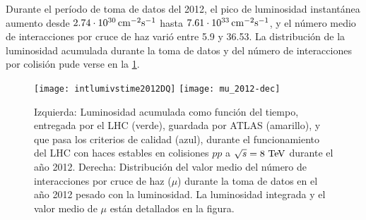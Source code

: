 Durante el período de toma de datos del 2012, el pico de luminosidad instantánea
aumento desde $\unit[2.74 \cdot 10^{30}]{cm^{-2} s^{-1}}$ hasta
$\unit[7.61 \cdot 10^{33}]{cm^{-2} s^{-1}}$, y el número medio de interacciones por cruce
de haz varió entre 5.9 y 36.53. La distribución de la luminosidad acumulada
durante la toma de datos y del número de interacciones por colisión pude verse en
la \cref{fig:lumi}.

\begin{figure}[!p]
  \centering

  \texttt{[image: intlumivstime2012DQ]}
  \texttt{[image: mu\_2012-dec]}

  \caption{Izquierda: Luminosidad acumulada como función del tiempo, entregada por el LHC (verde),
    guardada por ATLAS (amarillo), y que pasa los criterios de calidad (azul),
    durante el funcionamiento del LHC con haces estables en colisiones $pp$ a $\sqrt{s}=8\tev$ durante el a\~no 2012\cite{lumiplots}.
    Derecha: Distribución del valor medio del número de interacciones por cruce
    de haz ($\mu$) durante la toma de datos en el a\~no 2012 pesado con la luminosidad.
    La luminosidad integrada y el valor medio de $\mu$ están detallados en la figura.
  }
  \label{fig:lumi}

\end{figure}
